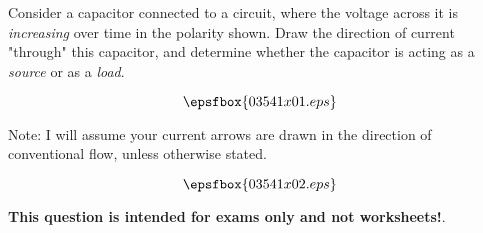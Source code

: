 

Consider a capacitor connected to a circuit, where the voltage across it is {\it increasing} over time in the polarity shown.  Draw the direction of current "through" this capacitor, and determine whether the capacitor is acting as a {\it source} or as a {\it load}.

$$\epsfbox{03541x01.eps}$$

Note: I will assume your current arrows are drawn in the direction of conventional flow, unless otherwise stated.







$$\epsfbox{03541x02.eps}$$







{\bf This question is intended for exams only and not worksheets!}.



